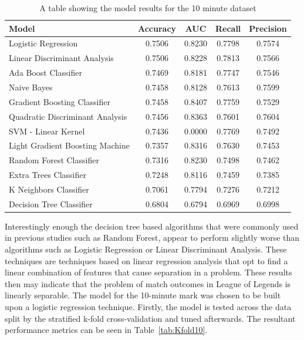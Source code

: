 \begin{table}[h!]
    \centering
    \caption{A table showing the model results for the 10 minute dataset}
    \begin{tabular}{l c c c c }
        \toprule
        \textbf{Model} & \textbf{Accuracy} & \textbf{AUC} & \textbf{Recall} & \textbf{Precision} \\
        \midrule
        Logistic Regression & 0.7506 & 0.8230 & 0.7798 & 0.7574  \\
        Linear Discriminant Analysis & 0.7506 & 0.8228 & 0.7813 & 0.7566 \\
        Ada Boost Classifier & 0.7469 & 0.8181 & 0.7747 & 0.7546 \\
        Naive Bayes & 0.7458 & 0.8128 & 0.7613 & 0.7599 \\
        Gradient Boosting Classifier & 0.7458 & 0.8407 & 0.7759 & 0.7529 \\
        Quadratic Discriminant Analysis & 0.7456 & 0.8363 & 0.7601 & 0.7604 \\
        SVM - Linear Kernel & 0.7436 & 0.0000 & 0.7769 & 0.7492 \\
        Light Gradient Boosting Machine & 0.7357 & 0.8316 & 0.7630 & 0.7453 \\
        Random Forest Classifier & 0.7316 & 0.8230 & 0.7498 & 0.7462 \\
        Extra Trees Classifier & 0.7248 & 0.8116 & 0.7459 & 0.7385  \\
        K Neighbors Classifier & 0.7061 & 0.7794 & 0.7276 & 0.7212  \\
        Decision Tree Classifier & 0.6804 & 0.6794 & 0.6969 & 0.6998 \\
        \bottomrule
    \end{tabular}
    \label{tab:ModelResults10}
\end{table}

Interestingly enough the decision tree based algorithms that were commonly used in previous studies such as Random Forest, appear to perform slightly worse than algorithms such as Logistic Regression or Linear Discriminant Analysis.
These techniques are techniques based on linear regression analysis that opt to find a linear combination of features that cause separation in a problem.
These results then may indicate that the problem of match outcomes in League of Legends is linearly separable.
The model for the 10-minute mark was chosen to be built upon a logistic regression technique.
Firstly, the model is tested across the data split by the stratified k-fold cross-validation and tuned afterwards.
The resultant performance metrics can be seen in Table~\ref{tab:Kfold10}. \\

